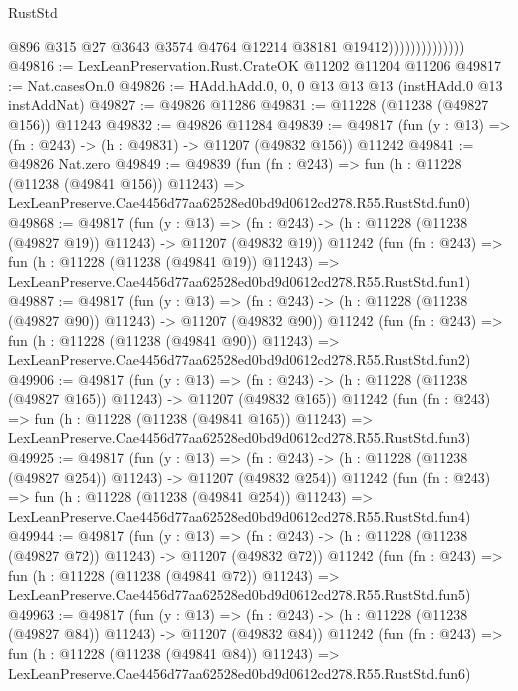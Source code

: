 \begin{lexlean}{RustStd}
\begin{coremodule}
                                @896
                                @315
                                @27
                                @3643
                                @3574
                                @4764
                                @12214
                                @38181
                                @19412))))))))))))))
@49816 := LexLeanPreservation.Rust.CrateOK @11202 @11204 @11206
@49817 := Nat.casesOn.{0}
@49826 := HAdd.hAdd.{0, 0, 0} @13 @13 @13 (instHAdd.{0} @13 instAddNat)
@49827 := @49826 @11286
@49831 := @11228 (@11238 (@49827 @156)) @11243
@49832 := @49826 @11284
@49839 := @49817 (fun (y : @13) => (fn : @243) -> (h : @49831) -> @11207 (@49832 @156)) @11242
@49841 := @49826 Nat.zero
@49849 := @49839
    (fun (fn : @243) =>
    fun (h : @11228 (@11238 (@49841 @156)) @11243) =>
    LexLeanPreserve.Cae4456d77aa62528ed0bd9d0612cd278.R55.RustStd.fun0)
@49868 := @49817
    (fun (y : @13) =>
    (fn : @243) -> (h : @11228 (@11238 (@49827 @19)) @11243) -> @11207 (@49832 @19))
    @11242
    (fun (fn : @243) =>
    fun (h : @11228 (@11238 (@49841 @19)) @11243) =>
    LexLeanPreserve.Cae4456d77aa62528ed0bd9d0612cd278.R55.RustStd.fun1)
@49887 := @49817
    (fun (y : @13) =>
    (fn : @243) -> (h : @11228 (@11238 (@49827 @90)) @11243) -> @11207 (@49832 @90))
    @11242
    (fun (fn : @243) =>
    fun (h : @11228 (@11238 (@49841 @90)) @11243) =>
    LexLeanPreserve.Cae4456d77aa62528ed0bd9d0612cd278.R55.RustStd.fun2)
@49906 := @49817
    (fun (y : @13) =>
    (fn : @243) -> (h : @11228 (@11238 (@49827 @165)) @11243) -> @11207 (@49832 @165))
    @11242
    (fun (fn : @243) =>
    fun (h : @11228 (@11238 (@49841 @165)) @11243) =>
    LexLeanPreserve.Cae4456d77aa62528ed0bd9d0612cd278.R55.RustStd.fun3)
@49925 := @49817
    (fun (y : @13) =>
    (fn : @243) -> (h : @11228 (@11238 (@49827 @254)) @11243) -> @11207 (@49832 @254))
    @11242
    (fun (fn : @243) =>
    fun (h : @11228 (@11238 (@49841 @254)) @11243) =>
    LexLeanPreserve.Cae4456d77aa62528ed0bd9d0612cd278.R55.RustStd.fun4)
@49944 := @49817
    (fun (y : @13) =>
    (fn : @243) -> (h : @11228 (@11238 (@49827 @72)) @11243) -> @11207 (@49832 @72))
    @11242
    (fun (fn : @243) =>
    fun (h : @11228 (@11238 (@49841 @72)) @11243) =>
    LexLeanPreserve.Cae4456d77aa62528ed0bd9d0612cd278.R55.RustStd.fun5)
@49963 := @49817
    (fun (y : @13) =>
    (fn : @243) -> (h : @11228 (@11238 (@49827 @84)) @11243) -> @11207 (@49832 @84))
    @11242
    (fun (fn : @243) =>
    fun (h : @11228 (@11238 (@49841 @84)) @11243) =>
    LexLeanPreserve.Cae4456d77aa62528ed0bd9d0612cd278.R55.RustStd.fun6)

\end{coremodule}
\end{lexlean}

